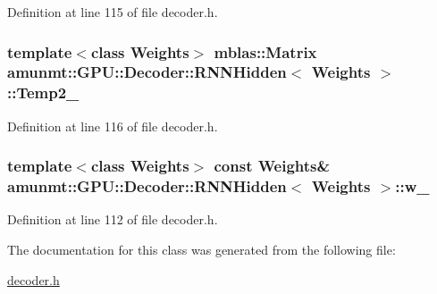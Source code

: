 Definition at line 115 of file decoder.\+h.

\subsubsection[{\texorpdfstring{Temp2\+\_\+}{Temp2_}}]{\setlength{\rightskip}{0pt plus 5cm}template$<$class Weights$>$ {\bf mblas\+::\+Matrix} {\bf amunmt\+::\+G\+P\+U\+::\+Decoder\+::\+R\+N\+N\+Hidden}$<$ {\bf Weights} $>$\+::Temp2\+\_\+\hspace{0.3cm}{\ttfamily [private]}}\hypertarget{classamunmt_1_1GPU_1_1Decoder_1_1RNNHidden_a19dc15b3feae837ac18e9014cffc4a9d}{}\label{classamunmt_1_1GPU_1_1Decoder_1_1RNNHidden_a19dc15b3feae837ac18e9014cffc4a9d}


Definition at line 116 of file decoder.\+h.

\subsubsection[{\texorpdfstring{w\+\_\+}{w_}}]{\setlength{\rightskip}{0pt plus 5cm}template$<$class Weights$>$ const {\bf Weights}\& {\bf amunmt\+::\+G\+P\+U\+::\+Decoder\+::\+R\+N\+N\+Hidden}$<$ {\bf Weights} $>$\+::w\+\_\+\hspace{0.3cm}{\ttfamily [private]}}\hypertarget{classamunmt_1_1GPU_1_1Decoder_1_1RNNHidden_a96f70b0f258c493213bccb861f0014d0}{}\label{classamunmt_1_1GPU_1_1Decoder_1_1RNNHidden_a96f70b0f258c493213bccb861f0014d0}


Definition at line 112 of file decoder.\+h.



The documentation for this class was generated from the following file\+:\begin{DoxyCompactItemize}
\item 
\hyperlink{decoder_8h}{decoder.\+h}\end{DoxyCompactItemize}

